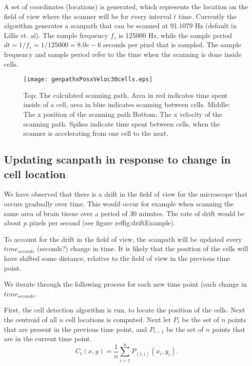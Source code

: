 \documentclass{article}
\begin{document}
A set of coordinates (locations) is generated, which represents the location on the field of view where the scanner will be for every interval $t$ time.  
Currently the algorithm generates a scanpath that can be scanned at 91.1079 Hz (default in Lillis et. al). \cite{lillis} The sample frequency $f_s$ is 125000 Hz,
while the sample period $dt = 1/f_s = 1/125000 = 8.0e-6$ seconds per pixel that is sampled.  The sample frequency and sample period refer to the time 
when the scanning is done inside cells.   


\begin{figure}[bp]
\begin{center}
\texttt{[image: genpathxPosxVeloc30cells.eps]}
\end{center}
\caption{Top: The calculated scanning path.  Area in red indicates time spent inside of a cell, area in blue indicates scanning between cells.  Middle: The x position of the scanning path
     Bottom: The x velocity of the scanning path.  Spikes indicate time spent between cells, when the scanner is accelerating from one cell to the next.}
\label{fig:genpathOutput}

\end{figure}


\subsection{Updating scanpath in response to change in cell location}
We have observed that there is a drift in the field of view for the microscope that occurs gradually over time.  This would occur for example when 
scanning the same area of brain tissue over a period of 30 minutes.  The rate of drift would be about $p$ pixels per second (see figure ref{fig:driftExample}).  

To account for the drift in the field of view, the scanpath will be updated every $time_{seconds}$ (seconds?) change in time. It is likely that the position of the cells will have shifted some distance,
relative to the field of view in the previous time point.  

We iterate through the following process for each new time point (each change in $time_{seconds}$.  

First, the cell detection algorithm is run, to locate the position of the cells.  Next the centroid of 
all $n$ cell locations is computed.  
Next let $P_t$ be the set of $n$ points that are present in the previous time point, and $P_{t-1}$ be the set of $n$ points that are in the current time point.  
\begin{equation}
C_t(x,y) = \frac{1}{n}\sum_{i=1}^{n}P_{(t,i)}(x_i, y_i).
\end{equation}
\end{document}

